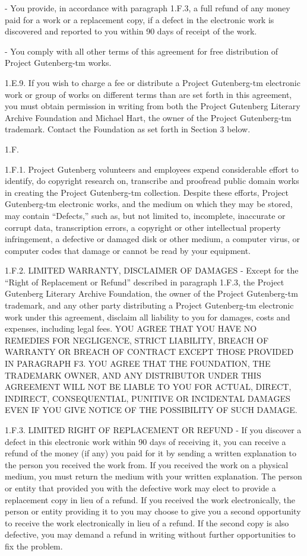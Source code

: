 - You provide, in accordance with paragraph 1.F.3, a full refund of any
     money paid for a work or a replacement copy, if a defect in the
     electronic work is discovered and reported to you within 90 days
     of receipt of the work.

- You comply with all other terms of this agreement for free
     distribution of Project Gutenberg-tm works.

1.E.9.  If you wish to charge a fee or distribute a Project Gutenberg-tm
electronic work or group of works on different terms than are set
forth in this agreement, you must obtain permission in writing from
both the Project Gutenberg Literary Archive Foundation and Michael
Hart, the owner of the Project Gutenberg-tm trademark.  Contact the
Foundation as set forth in Section 3 below.

1.F.

1.F.1.  Project Gutenberg volunteers and employees expend considerable
effort to identify, do copyright research on, transcribe and proofread
public domain works in creating the Project Gutenberg-tm
collection.  Despite these efforts, Project Gutenberg-tm electronic
works, and the medium on which they may be stored, may contain
“Defects,” such as, but not limited to, incomplete, inaccurate or
corrupt data, transcription errors, a copyright or other intellectual
property infringement, a defective or damaged disk or other medium, a
computer virus, or computer codes that damage or cannot be read by
your equipment.

1.F.2.  LIMITED WARRANTY, DISCLAIMER OF DAMAGES - Except for the “Right
of Replacement or Refund” described in paragraph 1.F.3, the Project
Gutenberg Literary Archive Foundation, the owner of the Project
Gutenberg-tm trademark, and any other party distributing a Project
Gutenberg-tm electronic work under this agreement, disclaim all
liability to you for damages, costs and expenses, including legal
fees.  YOU AGREE THAT YOU HAVE NO REMEDIES FOR NEGLIGENCE, STRICT
LIABILITY, BREACH OF WARRANTY OR BREACH OF CONTRACT EXCEPT THOSE
PROVIDED IN PARAGRAPH F3.  YOU AGREE THAT THE FOUNDATION, THE
TRADEMARK OWNER, AND ANY DISTRIBUTOR UNDER THIS AGREEMENT WILL NOT BE
LIABLE TO YOU FOR ACTUAL, DIRECT, INDIRECT, CONSEQUENTIAL, PUNITIVE OR
INCIDENTAL DAMAGES EVEN IF YOU GIVE NOTICE OF THE POSSIBILITY OF SUCH
DAMAGE.

1.F.3.  LIMITED RIGHT OF REPLACEMENT OR REFUND - If you discover a
defect in this electronic work within 90 days of receiving it, you can
receive a refund of the money (if any) you paid for it by sending a
written explanation to the person you received the work from.  If you
received the work on a physical medium, you must return the medium with
your written explanation.  The person or entity that provided you with
the defective work may elect to provide a replacement copy in lieu of a
refund.  If you received the work electronically, the person or entity
providing it to you may choose to give you a second opportunity to
receive the work electronically in lieu of a refund.  If the second copy
is also defective, you may demand a refund in writing without further
opportunities to fix the problem.

